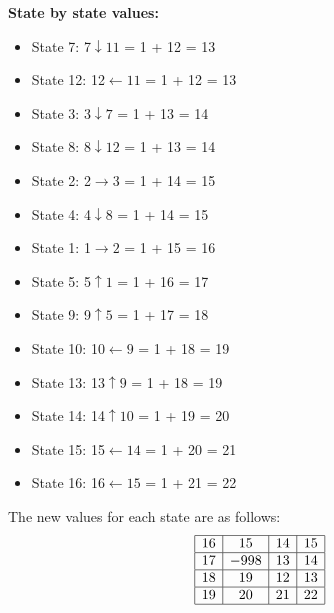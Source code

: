 \documentclass{article}
\begin{document}
\begin{enumerate}[label=(\alph*)]
    \textbf{State by state values:}
    \begin{itemize}
        \item State 7: 7$\downarrow 11$ = 1 + 12 = 13
        \item State 12: 12$\leftarrow 11$ = 1 + 12 = 13
        \item State 3: 3$\downarrow 7$ = 1 + 13 = 14
        \item State 8: 8$\downarrow 12$ = 1 + 13 = 14
        \item State 2: 2$\rightarrow 3$ = 1 + 14 = 15
        \item State 4: 4$\downarrow 8$ = 1 + 14 = 15
        \item State 1: 1$\rightarrow 2$ = 1 + 15 = 16
        \item State 5: 5$\uparrow 1$ = 1 + 16 = 17
        \item State 9: 9$\uparrow 5$ = 1 + 17 = 18
        \item State 10: 10$\leftarrow 9$ = 1 + 18 = 19
        \item State 13: 13$\uparrow 9$ = 1 + 18 = 19
        \item State 14: 14$\uparrow 10$ = 1 + 19 = 20
        \item State 15: 15$\leftarrow 14$ = 1 + 20 = 21
        \item State 16: 16$\leftarrow 15$ = 1 + 21 = 22
    \end{itemize}

    The new values for each state are as follows:
    \[
    \begin{array}{|c|c|c|c|}
    \hline
    16 & 15 & 14 & 15 \\ \hline
    17 & -998 & 13 & 14 \\ \hline
    18 & 19 & 12 & 13 \\ \hline
    19 & 20 & 21 & 22 \\ \hline
    \end{array}
    \]
\end{enumerate}
\end{document}
